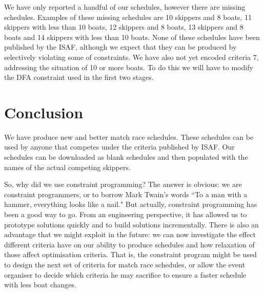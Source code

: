 \documentclass{llncs}
\begin{document}
We have only reported a handful of our schedules, however there are missing schedules. Examples of these missing schedules are 10 skippers and 8 boats, 11 skippers with less than 10 boats, 12 skippers and 8 boats, 13 skippers and 8 boats and 14 skippers with less than 10 boats. None of these schedules have been published by the ISAF, although we expect that they can be produced by selectively violating some of constraints. We have also not yet encoded criteria 7, addressing the situation of 10 or more boats. To do this we will have to modify the DFA constraint used in the first two stages. 

\section{Conclusion}\label{sec:conclusions}
We have produce new and better match race schedules. These schedules can be used by anyone that competes under the criteria published by ISAF. Our schedules can be downloaded as blank schedules and then populated with the names of the actual competing skippers. 

So, why did we use constraint programming? The answer is obvious:  we are constraint programmers, or to borrow Mark Twain's words ``To a man with a hammer, everything looks like a nail." But actually, constraint programming has been a good way to go. From an engineering perspective, it has allowed us to prototype solutions quickly and to build solutions incrementally. There is also an advantage that we might exploit in the future: we can now investigate the effect different criteria have on our ability to produce schedules and how relaxation of those affect optimisation criteria. That is, the constraint program might be used to design the next set of criteria for match race schedules, or allow the event organiser to decide which criteria he may sacrifice to ensure a faster schedule with less boat changes.





\end{document}
